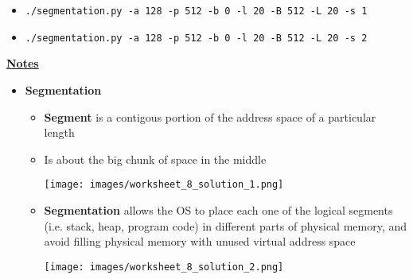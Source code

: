\documentclass[12pt]{article}
\begin{document}
\begin{enumerate}[1.]
\begin{itemize}
        \item \texttt{./segmentation.py -a 128 -p 512 -b 0 -l 20 -B 512 -L 20 -s 1}
        \item \texttt{./segmentation.py -a 128 -p 512 -b 0 -l 20 -B 512 -L 20 -s 2}
    \end{itemize}


    \bigskip

    \underline{\textbf{Notes}}

    \begin{itemize}
        \item \textbf{Segmentation}

        \begin{itemize}
            \item \textbf{Segment} is a contigous portion of the address space of a particular length
            \item Is about the big chunk of space in the middle

            \begin{center}
            \texttt{[image: images/worksheet\_8\_solution\_1.png]}
            \end{center}

            \item \textbf{Segmentation} allows the OS to place each one of the logical segments (i.e. stack, heap, program code)
            in different parts of physical memory, and avoid filling physical memory with unused virtual address space


            \begin{center}
            \texttt{[image: images/worksheet\_8\_solution\_2.png]}
            \end{center}
        \end{itemize}
    \end{itemize}


\end{enumerate}
\end{document}
